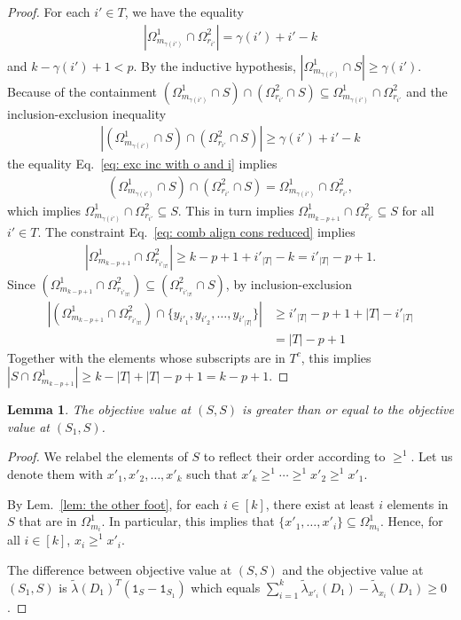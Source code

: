 \documentclass[12pt]{article}
\newtheorem{lem}[thm]{Lemma}
\theoremstyle{definition}
\numberwithin{equation}{section}
\numberwithin{equation}{section}
\newcommand{\la}{\lambda}
\newcommand{\one}{\mathtt{1}}
\newcommand{\ga}{\gamma}
\newcommand{\Og}{\Omega}
\begin{document}
\begin{proof}
For each \(i' \in T\), we have the equality
\begin{align}
\label{eq: exc inc with o and i}
| \Og^1_{m_{\ga(i')}} \cap \Og^2_{r_{i'}}| = \ga(i') + i' - k
\end{align}
and \(k-\ga(i')+1 < p\). By the inductive hypothesis,  \(|\Og^1_{m_{\ga(i')}} \cap S| \geq \ga(i')\). 
Because of the containment \((\Og^1_{m_{\ga(i')}} \cap S) \cap (\Og^2_{r_{i'}} \cap S) \subseteq \Og^1_{m_{\ga(i')}} \cap \Og^2_{r_{i'}}\) and the inclusion-exclusion inequality
\begin{gather}
| (\Og^1_{m_{\ga(i')}} \cap S) \cap (\Og^2_{r_{i'}} \cap S)| \geq \ga(i') + i' - k
\end{gather}
the equality Eq.~\ref{eq: exc inc with o and i} implies 
\begin{gather}
\label{eq: equality of sets}
(\Og^1_{m_{\ga(i')}} \cap S) \cap (\Og^2_{r_{i'}} \cap S) = \Og^1_{m_{\ga(i')}} \cap \Og^2_{r_{i'}},
\end{gather}
which implies \(\Og^1_{m_{\ga(i')}} \cap \Og^2_{r_{i'}} \subseteq S\). This in turn implies \(\Og^1_{m_{k-p+1}} \cap \Og^2_{r_{i'}} \subseteq S\) for all \(i' \in T\). The constraint Eq.~\ref{eq: comb align cons reduced} implies
\begin{gather} 
|\Og^1_{m_{k-p+1}} \cap \Og^2_{r_{i'_{|T|}}}| \geq k-p+1+ i'_{|T|} - k = i'_{|T|} - p + 1.
\end{gather}
Since \(({\Og^1_{m_{k-p+1}}} \cap {\Og^2_{r_{i'_{|T|}}}}) \subseteq ({\Og^2_{r_{i'_{|T|}}}} \cap S)\), by inclusion-exclusion
\begin{align}
    |({\Og^1_{m_{k-p+1}}} \cap {\Og^2_{r_{i'_{|T|}}}}) \cap \{y_{i'_1}, y_{i'_2}, \ldots, y_{i'_{|T|}}\}| &\geq i'_{|T|} -p + 1 + |T| - i'_{|T|} \\
    &= |T| - p +1
\end{align}
Together with the elements whose subscripts are in \(T^c\), this implies
\( | S \cap \Og^1_{m_{k-p+1}}| \geq k - |T| + |T| - p + 1 = k - p + 1.\) \end{proof}


\begin{lem}
\label{lem: final lemma}
 The objective value at \((S, S)\) is greater than or equal to the
objective value at \((S_1, S)\). 
\end{lem}
\begin{proof}
We relabel the elements of \(S\) to reflect their order according to \(\geq^1\). Let us denote them with \(x'_1, x'_2, \ldots, x'_k\) such that \(x'_k \geq^1 \cdots \geq^1 x'_2 \geq^1 x'_1\). 

By Lem.~\ref{lem: the other foot}, for each \(i \in [k]\), there exist at least \(i\) elements in \(S\) that are in \(\Og^1_{m_{i}}\). In particular, this implies that \(\{x'_1, \ldots, x'_i\} \subseteq \Og^1_{m_{i}}\). Hence, for all \(i \in [k]\), \(x_i \geq^1 x'_i\).    

The difference between objective value at \((S, S)\) and the objective value at \((S_1, S)\) is  \(\tilde{\la}(D_1)^T (\one_{S} -  \one_{S_1})\) which equals
\(\sum_{i=1}^k \tilde{\la}_{x'_i}(D_1) - \tilde{\la}_{x_i} (D_1) \geq 0\). \end{proof}




\end{document}
